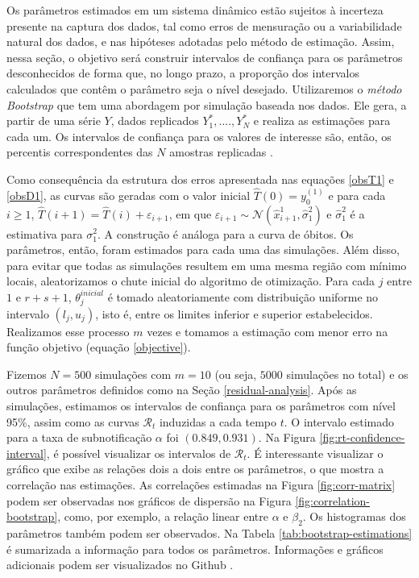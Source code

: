 Os parâmetros estimados em um sistema dinâmico estão sujeitos à incerteza presente na captura dos dados, tal como erros de mensuração ou a variabilidade natural dos dados, e nas hipóteses adotadas pelo método de estimação. 
Assim, nessa seção, o objetivo será construir intervalos de confiança para os parâmetros desconhecidos de forma que, no longo prazo, a proporção dos intervalos calculados que contêm o parâmetro seja o nível desejado. 
Utilizaremos o {\em método Bootstrap} \cite{efron1986} que tem uma abordagem por simulação baseada nos dados. Ele gera, a partir de uma série $Y$, dados replicados $Y_1^*, ...., Y_N^*$ e realiza as estimações para cada um. 
Os intervalos de confiança para os valores de interesse são, então, os percentis correspondentes das $N$ amostras replicadas \cite{joshi2006}. 

Como consequência da estrutura dos erros apresentada nas equações \eqref{obsT1} e \eqref{obsD1}, as curvas são geradas com o valor inicial $\hat{T}(0) = y_0^{(1)}$ e para cada $i \ge 1$, $\hat{T}(i+1) = \hat{T}(i) + \varepsilon_{i+1}$, em que $\varepsilon_{i+1} \sim \mathcal{N}(\hat{x}_{i+1}^{1}, \hat{\sigma}_1^2)$ e $\hat{\sigma}_1^2$ é a estimativa para $\sigma_1^2$. A construção é análoga para a curva de óbitos.
Os parâmetros, então, foram estimados para cada uma das simulações. 
Além disso, para evitar que todas as simulações resultem em uma mesma região com mínimo locais, aleatorizamos o chute inicial do algoritmo de otimização. Para cada $j$ entre $1$ e $r+s+1$, $\theta_j^{inicial}$ é tomado aleatoriamente com distribuição uniforme no intervalo $(l_j, u_j)$, isto é, entre os limites inferior e superior estabelecidos. Realizamos esse processo $m$ vezes e tomamos a estimação com menor erro na função objetivo (equação \eqref{objective}). 

Fizemos $N = 500$ simulações com $m = 10$ (ou seja, $5000$ simulações no
total) e os outros parâmetros definidos como na Seção \ref{residual-analysis}. Após as simulações, estimamos os intervalos de confiança para os
parâmetros com nível 95\%, assim como as curvas $\mathcal{R}_t$ induzidas a
cada tempo $t$. O intervalo estimado para a taxa de subnotificação $\alpha$
foi $(0.849,0.931)$. Na Figura \ref{fig:rt-confidence-interval}, é possível
visualizar os intervalos de $\mathcal{R}_t$. É interessante visualizar o
gráfico que exibe as relações dois a dois entre os parâmetros, o que mostra a
correlação nas estimações. 
As correlações estimadas na Figura \ref{fig:corr-matrix} podem ser observadas
nos gráficos de dispersão na Figura \ref{fig:correlation-bootstrap}, como, por
exemplo, a relação linear entre $\alpha$ e $\beta_2$. 
Os histogramas dos parâmetros também podem ser observados. Na Tabela \ref{tab:bootstrap-estimations} é sumarizada a informação para todos os parâmetros. Informações e gráficos adicionais podem ser visualizados no Github \cite{github}.

